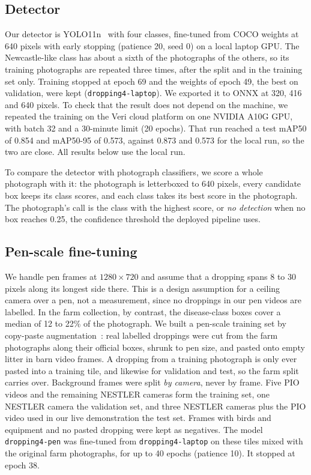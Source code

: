 \documentclass[10pt,twocolumn]{article}
\begin{document}
\subsection{Detector}
\label{sec:detector}

Our detector is YOLO11n~\cite{jocher2024yolo11} with four classes, fine-tuned from COCO weights at 640 pixels with early stopping (patience 20, seed 0) on a local laptop GPU. The Newcastle-like class has about a sixth of the
photographs of the others, so its training photographs are repeated three times, after the split and in the training
set only. Training stopped at epoch 69 and the weights of epoch 49, the best on validation, were kept
(\texttt{dropping4-laptop}). We exported it to ONNX at 320, 416 and 640 pixels. To check that the result does not depend on the machine, we repeated the training on the Veri cloud
platform on one NVIDIA A10G GPU, with batch 32 and a 30-minute limit (20 epochs). That run reached a test mAP50
of 0.854 and mAP50-95 of 0.573, against 0.873 and 0.573 for the local run, so the two are close. All results below
use the local run.

To compare the detector with photograph classifiers, we score a whole photograph with it: the photograph is
letterboxed to 640 pixels, every candidate box keeps its class scores, and each class takes its best score in the
photograph. The photograph's call is the class with the highest score, or \emph{no detection} when no box reaches
0.25, the confidence threshold the deployed pipeline uses.

\subsection{Pen-scale fine-tuning}
\label{sec:pen}

We handle pen frames at $1280\times720$ and assume that a dropping spans 8 to 30 pixels along its longest side there.
This is a design assumption for a ceiling camera over a pen, not a measurement, since no droppings in our pen videos
are labelled. In the farm collection, by contrast, the disease-class boxes cover a median of 12 to 22\% of the
photograph. We built a pen-scale training set by copy-paste
augmentation~\cite{ghiasi2021}: real labelled droppings were cut from the farm photographs along their
official boxes, shrunk to pen size, and pasted onto empty litter in barn video frames. A dropping from a training
photograph is only ever pasted into a training tile, and likewise for validation and test, so the farm split carries
over. Background frames were split \emph{by camera}, never by frame. Five PIO videos and the remaining NESTLER cameras
form the training set, one NESTLER camera the validation set, and three NESTLER cameras plus the PIO video used in our
live demonstration the test set. Frames with birds and equipment and no pasted dropping were kept as negatives. The
model \texttt{dropping4-pen} was fine-tuned from \texttt{dropping4-laptop} on these tiles mixed with the original
farm photographs, for up to 40 epochs (patience 10). It stopped at epoch 38.
\end{document}
